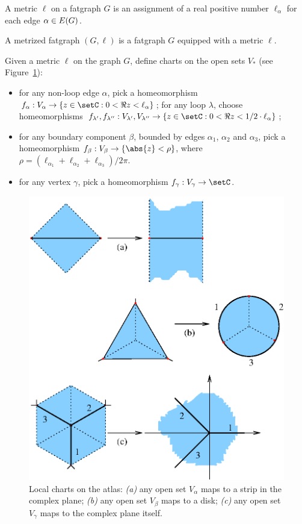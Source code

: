 \begin{definition}
  \label{dfn:metric-ribbon-graphs}
  A metric $\ell$ on a fatgraph $G$ is an assignment of a real
  positive number $\ell_\alpha$ for each edge $\alpha \in E(G)$.

  A metrized fatgraph $(G, \ell)$ is a fatgraph $G$ equipped with
  a metric $\ell$.
\end{definition}

Given a metric $\ell$ on the graph $G$, define charts on the open sets
$V_*$ (see Figure~\ref{fig:charts}):
\begin{itemize}
\item for any non-loop edge $\alpha$, pick a homeomorphism $f_\alpha: V_\alpha \to \{ z \in \setC
  : 0 < \Re z < \ell_\alpha \}$; for any loop $\lambda$, choose
  homeomorphisms $f_{\lambda'}, f_{\lambda''}: V_{\lambda'}, V_{\lambda''} \to \{ z \in \setC
  : 0 < \Re z < 1/2 \cdot \ell_\alpha \}$;
\item for any boundary component $\beta$, bounded by edges $\alpha_1$, $\alpha_2$
  and $\alpha_3$, pick a homeomorphism $f_\beta: V_\beta \to \{ \abs{z} < \rho \}$, where
  $\rho = (\ell_{\alpha_1} + \ell_{\alpha_2} + \ell_{\alpha_3}) / 2\pi$.
\item for any vertex $\gamma$, pick a homeomorphism $f_\gamma: V_\gamma \to \setC$.
\end{itemize}
\begin{figure}[htbp]
  \centering\includegraphics{charts}
  \caption{Local charts on the atlas: \textsl{(a)} any open set
    $V_\alpha$ maps to a strip in the complex plane; \textsl{(b)} any
    open set $V_\beta$ maps to a disk; \textsl{(c)} any open set
    $V_\gamma$ maps to the complex plane itself.}
  \label{fig:charts}
\end{figure}
